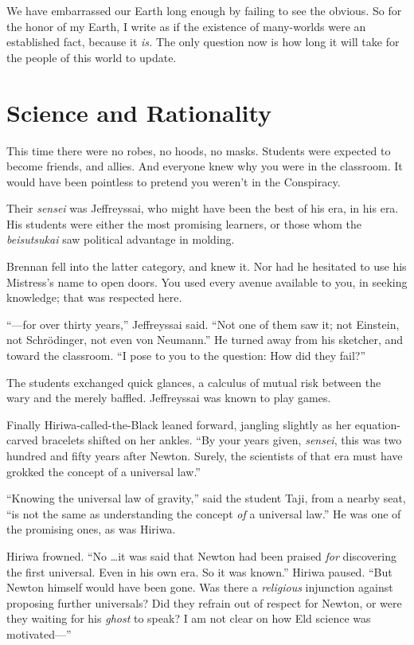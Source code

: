 {
 We have embarrassed our Earth long enough by failing to see the
obvious. So for the honor of my Earth, I write as if the existence of
many-worlds were an established fact, because it \textit{is.} The only
question now is how long it will take for the people of this world to
update.}

\myendsectiontext

\chapter{Science and Rationality}


{
 This time there were no robes, no hoods, no masks. Students were
expected to become friends, and allies. And everyone knew why you were
in the classroom. It would have been pointless to pretend you
weren't in the Conspiracy. }

{
 Their \textit{sensei} was Jeffreyssai, who might have been the
best of his era, in his era. His students were either the most
promising learners, or those whom the \textit{beisutsukai} saw
political advantage in molding.}

{
 Brennan fell into the latter category, and knew it. Nor had he
hesitated to use his Mistress's name to open doors. You
used every avenue available to you, in seeking knowledge; that was
respected here.}

{
 ``---for over thirty years,''
Jeffreyssai said. ``Not one of them saw it; not
Einstein, not Schrödinger, not even von Neumann.'' He
turned away from his sketcher, and toward the classroom.
``I pose to you to the question: How did they
fail?''}

{
 The students exchanged quick glances, a calculus of mutual risk
between the wary and the merely baffled. Jeffreyssai was known to play
games.}

{
 Finally Hiriwa-called-the-Black leaned forward, jangling slightly
as her equation-carved bracelets shifted on her ankles.
``By your years given, \textit{sensei}, this was two
hundred and fifty years after Newton. Surely, the scientists of that
era must have grokked the concept of a universal
law.''}

{
 ``Knowing the universal law of
gravity,'' said the student Taji, from a nearby seat,
``is not the same as understanding the concept
\textit{of} a universal law.'' He was one of the
promising ones, as was Hiriwa.}

{
 Hiriwa frowned. ``No \ldots it was said that
Newton had been praised \textit{for} discovering the first universal.
Even in his own era. So it was known.'' Hiriwa
paused. ``But Newton himself would have been gone. Was
there a \textit{religious} injunction against proposing further
universals? Did they refrain out of respect for Newton, or were they
waiting for his \textit{ghost} to speak? I am not clear on how Eld
science was motivated---''}

